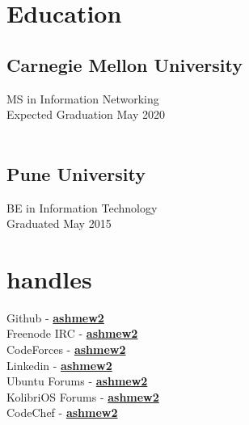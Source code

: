 \documentclass[letterpaper]{deedy-resume} %
\begin{document}
\begin{minipage}[t]{0.33\textwidth} %
\section{Education}

\subsection[Carnegie Mellon University]{Carnegie Mellon \newline University}
MS in Information Networking \\
Expected Graduation May 2020 \\
\  \\ %

\subsection{Pune University}
BE in Information Technology \\
Graduated May 2015 \\
\sectionspace %
\section{handles}
Github - \href{https://github.com/ashmew2}{\bf ashmew2} \\
Freenode IRC - \href{http://freenode.org} {\bf ashmew2} \\
CodeForces - \href{http://codeforces.com/profile/ashmew2}{\bf ashmew2} \\
Linkedin - \href{in.linkedin.com/in/ashmew2/} {\bf ashmew2} \\
Ubuntu Forums - \href{http://ubuntuforums.org/showthread.php?t=821461} {\bf ashmew2} \\
KolibriOS Forums - \href{http://board.kolibrios.org/memberlist.php?mode=viewprofile&u=6211} {\bf ashmew2} \\
CodeChef - \href{http://www.codechef.com/users/ashmew2}{\bf ashmew2} \\
\sectionspace %

\end{minipage}
\end{document}

